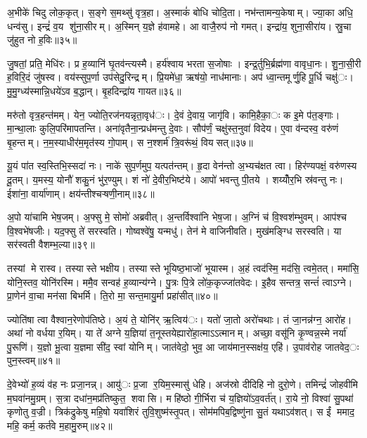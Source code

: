 अ॒भीके॑ चिदु लोक॒कृत्। स॒ङ्गे स॒मथ्सु॑ वृत्र॒हा। अ॒स्माकं॑ बोधि चोदि॒ता। नभ॑न्तामन्य॒केषाम्। ज्या॒का अधि॒ धन्व॑सु। इन्द्रं॑ व॒य शु॑ना॒सीरम्। अ॒स्मिन् य॒ज्ञे ह॑वामहे। आ वाजै॒रुप॑ नो गमत्। इन्द्रा॑य॒ शुना॒सीरा॑य। स्रु॒चा जु॑हुत नो ह॒विः॥३५॥

जु॒षतां॒ प्रति॒ मेधि॑रः। प्र ह॒व्यानि॑ घृ॒तव॑न्त्यस्मै। हर्य॑श्वाय भरता स॒जोषाः। इन्द्र॒र्तुभि॒र्ब्रह्म॑णा वावृधा॒नः। शु॒ना॒सी॒री ह॒विरि॒दं जु॑षस्व। वय॑स्सुप॒र्णा उप॑सेदु॒रिन्द्रम्। प्रि॒यमे॑धा॒ ऋष॑यो॒ नाध॑मानाः। अप॑ ध्वा॒न्तमूर्णु॒हि पू॒र्धि चक्षु॑ः। मु॒मु॒ग्ध्य॑स्मान्नि॒धये॑ऽव ब॒द्धान्। बृ॒हदिन्द्रा॑य गायत॥३६॥

मरु॑तो वृत्र॒हन्त॑मम्। येन॒ ज्योति॒रज॑नयन्नृता॒वृध॑ः। दे॒वं दे॒वाय॒ जागृ॑वि। कामि॒हैका॒ः क इ॒मे प॑त॒ङ्गाः। मा॒न्था॒लाः कुलि॒परि॑मापतन्ति। अना॑वृतैना॒न्प्रध॑मन्तु दे॒वाः। सौप॑र्णं॒ चक्षु॑स्त॒नुवा॑ विदेय। ए॒वा व॑न्दस्व॒ वरु॑णं बृ॒हन्तम्। न॒म॒स्याधीर॑म॒मृत॑स्य गो॒पाम्। स न॒श्शर्म॑ त्रि॒वरू॑थं॒ वियसत्॥३७॥

यू॒यं पा॑त स्व॒स्तिभि॒स्सदा॑ नः। नाके॑ सुप॒र्णमुप॒ यत्पत॑न्तम्। हृ॒दा वेन॑न्तो अ॒भ्यच॑क्षत त्वा। हिर॑ण्यपक्षं॒ वरु॑णस्य दू॒तम्। य॒मस्य॒ योनौ॑ शकु॒नं भु॑र॒ण्युम्। शं नो॑ दे॒वीर॒भिष्ट॑ये। आपो॑ भवन्तु पी॒तये। शय्योँर॒भि स्र॑वन्तु नः। ईशा॑ना॒ वार्या॑णाम्। क्षय॑न्तीश्चऱ्षणी॒नाम्॥३८॥

अ॒पो या॑चामि भेष॒जम्। अ॒फ्सु मे॒ सोमो॑ अब्रवीत्। अ॒न्तर्विश्वा॑नि भेष॒जा। अ॒ग्निं च॑ वि॒श्वश॑म्भुवम्। आप॑श्च वि॒श्वभे॑षजीः। यद॒फ्सु ते॑ सरस्वति। गोष्वश्वे॑षु॒ यन्मधु॑। तेन॑ मे वाजिनीवति। मुख॑मङ्ग्धि सरस्वति। या सर॑स्वती वैशम्भ॒ल्या॥३९॥

तस्यां मे रास्व। तस्यास्ते भक्षीय। तस्यास्ते भूयिष्ठ॒भाजो॑ भूयास्म। अ॒हं त्वद॑स्मि॒ मद॑सि॒ त्वमे॒तत्। ममा॑सि॒ योनि॒स्तव॒ योनि॑रस्मि। ममै॒व सन्वह॑ ह॒व्यान्य॑ग्ने। पु॒त्रः पि॒त्रे लो॑क॒कृज्जा॑तवेदः। इ॒हैव सन्तत्र॒ सन्तं॑ त्वाऽग्ने। प्रा॒णेन॑ वा॒चा मन॑सा बिभर्मि। ति॒रो मा॒ सन्त॒मायु॒र्मा प्रहा॑सीत्॥४०॥

ज्योति॑षा त्वा वैश्वान॒रेणोप॑तिष्ठे। अ॒यं ते॒ योनि॑र् ऋ॒त्विय॑ः। यतो॑ जा॒तो अरो॑चथाः। तं जा॒नन्न॑ग्न॒ आरो॑ह। अथा॑ नो वर्धया र॒यिम्। या ते॑ अग्ने य॒ज्ञिया॑ त॒नूस्तयेह्यारो॑हा॒त्माऽऽत्मानम्। अच्छा॒ वसू॑नि कृ॒ण्वन्न॒स्मे नर्या॑ पु॒रूणि॑। य॒ज्ञो भू॒त्वा य॒ज्ञमा सी॑द॒ स्वां योनिम्। जात॑वेदो॒ भुव॒ आ जाय॑मान॒स्सक्ष॑य॒ एहि॑। उ॒पाव॑रोह जातवेद॒ः पुन॒स्त्वम्॥४१॥

दे॒वेभ्यो॑ ह॒व्यं व॑ह नः प्रजा॒नन्न्। आयु॑ः प्र॒जा र॒यिम॒स्मासु॑ धेहि। अज॑स्रो दीदिहि नो दुरो॒णे। तमिन्द्रं॑ जोहवीमि म॒घवा॑नमु॒ग्रम्। स॒त्रा दधा॑न॒मप्र॑तिष्कुत॒ शवासि। महि॑ष्ठो गी॒र्भिरा च॑ य॒ज्ञियो॑ऽव॒वर्त॑त्। रा॒ये नो॒ विश्वा॑ सु॒पथा॑ कृणोतु व॒ज्री। त्रिक॑द्रुकेषु महि॒षो यवा॑शिरं तुवि॒शुष्म॑स्तृ॒पत्। सोम॑मपिब॒द्विष्णु॑ना सु॒तं यथाऽव॑शत्। स ईं ममाद॒ महि॒ कर्म॒ कर्त॑वे म॒हामु॒रुम्॥४२॥

